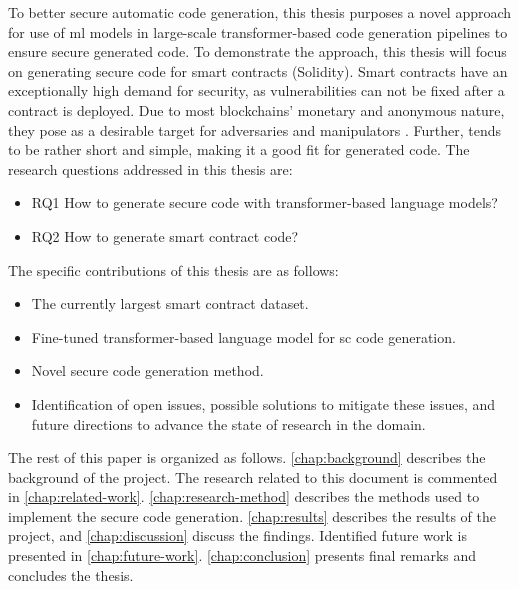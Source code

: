 To better secure automatic code generation, this thesis purposes a novel approach for use of \acrshort{ml} models in large-scale transformer-based code generation pipelines to ensure secure generated code. To demonstrate the approach, this thesis will focus on generating secure code for smart contracts (Solidity). Smart contracts have an exceptionally high demand for security, as vulnerabilities can not be fixed after a contract is deployed. Due to most blockchains' monetary and anonymous nature, they pose as a desirable target for adversaries and manipulators \cite{atzei2017survey}. Further,  tends to be rather short and simple, making it a good fit for generated code. The research questions addressed in this thesis are:
\begin{itemize}
    \item RQ1 How to generate secure code with transformer-based language models?
    \item RQ2 How to generate smart contract code?
\end{itemize}


\noindent
The specific contributions of this thesis are as follows:
\begin{itemize}
    \item The currently largest smart contract dataset.
    \item Fine-tuned transformer-based language model for \acrlong{sc} code generation.
    \item Novel secure code generation method.
    \item Identification of open issues, possible solutions to mitigate these issues, and future directions to advance the state of research in the domain.
\end{itemize}

The rest of this paper is organized as follows. \cref{chap:background} describes the background of the project. The research related to this document is commented in \cref{chap:related-work}. \cref{chap:research-method} describes the methods used to implement the secure code generation. \cref{chap:results} describes the results of the project, and \cref{chap:discussion} discuss the findings. Identified future work is presented in \cref{chap:future-work}. \cref{chap:conclusion} presents final remarks and concludes the thesis.
